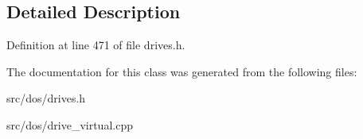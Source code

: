 \subsection{Detailed Description}


Definition at line 471 of file drives.\-h.



The documentation for this class was generated from the following files\-:\begin{DoxyCompactItemize}
\item 
src/dos/drives.\-h\item 
src/dos/drive\-\_\-virtual.\-cpp\end{DoxyCompactItemize}

